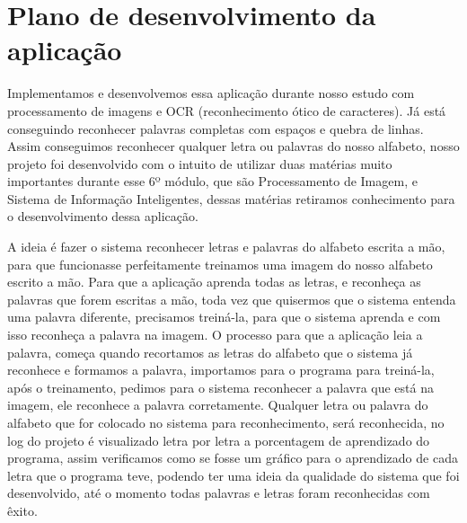 \newpage
\section{Plano de desenvolvimento da aplicação}

	Implementamos e desenvolvemos essa aplicação durante nosso estudo com processamento de imagens e OCR (reconhecimento ótico de caracteres). Já está conseguindo reconhecer palavras completas com espaços e quebra de linhas. Assim conseguimos reconhecer qualquer letra ou palavras do nosso alfabeto, nosso projeto foi desenvolvido com o intuito de utilizar duas matérias muito importantes durante esse 6º módulo, que são Processamento de Imagem, e Sistema de Informação Inteligentes, dessas matérias retiramos conhecimento para o desenvolvimento dessa aplicação. 
	
	A ideia é fazer o sistema reconhecer letras e palavras do alfabeto escrita a mão, para que funcionasse perfeitamente treinamos uma imagem do nosso alfabeto escrito a mão. Para que a aplicação aprenda todas as letras, e reconheça as palavras que forem escritas a mão, toda vez que quisermos que o sistema entenda uma palavra diferente, precisamos treiná-la, para que o sistema aprenda e com isso reconheça a palavra na imagem. O processo para que a aplicação leia a palavra, começa quando recortamos as letras do alfabeto que o sistema já reconhece e formamos a palavra, importamos para o programa para treiná-la, após o treinamento, pedimos para o sistema reconhecer a palavra que está na imagem, ele reconhece a palavra corretamente. Qualquer letra ou palavra do alfabeto que for colocado no sistema para reconhecimento, será reconhecida, no log do projeto é visualizado letra por letra a porcentagem de aprendizado do programa, assim verificamos como se fosse um gráfico para o aprendizado de cada letra que o programa teve, podendo ter uma ideia da qualidade do sistema que foi desenvolvido, até o momento todas palavras e letras foram reconhecidas com êxito. 

